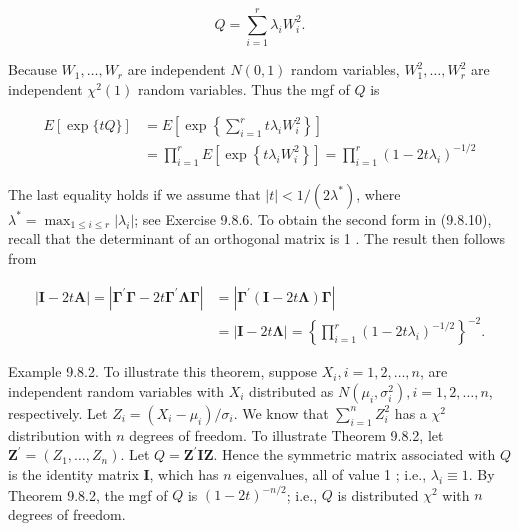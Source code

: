 \begin{equation*}
Q=\sum_{i=1}^{r} \lambda_{i} W_{i}^{2} . \tag{9.8.12}
\end{equation*}


Because $W_{1}, \ldots, W_{r}$ are independent $N(0,1)$ random variables, $W_{1}^{2}, \ldots, W_{r}^{2}$ are independent $\chi^{2}(1)$ random variables. Thus the mgf of $Q$ is


\begin{align*}
E[\exp \{t Q\}] & =E\left[\exp \left\{\sum_{i=1}^{r} t \lambda_{i} W_{i}^{2}\right\}\right] \\
& =\prod_{i=1}^{r} E\left[\exp \left\{t \lambda_{i} W_{i}^{2}\right\}\right]=\prod_{i=1}^{r}\left(1-2 t \lambda_{i}\right)^{-1 / 2} \tag{9.8.13}
\end{align*}


The last equality holds if we assume that $|t|<1 /\left(2 \lambda^{*}\right)$, where $\lambda^{*}=\max _{1 \leq i \leq r}\left|\lambda_{i}\right|$; see Exercise 9.8.6. To obtain the second form in (9.8.10), recall that the determinant of an orthogonal matrix is 1 . The result then follows from

$$
\begin{aligned}
|\mathbf{I}-2 t \mathbf{A}|=\left|\boldsymbol{\Gamma}^{\prime} \boldsymbol{\Gamma}-2 t \boldsymbol{\Gamma}^{\prime} \boldsymbol{\Lambda} \boldsymbol{\Gamma}\right| & =\left|\boldsymbol{\Gamma}^{\prime}(\mathbf{I}-2 t \boldsymbol{\Lambda}) \boldsymbol{\Gamma}\right| \\
& =|\mathbf{I}-2 t \boldsymbol{\Lambda}|=\left\{\prod_{i=1}^{r}\left(1-2 t \lambda_{i}\right)^{-1 / 2}\right\}^{-2} .
\end{aligned}
$$

Example 9.8.2. To illustrate this theorem, suppose $X_{i}, i=1,2, \ldots, n$, are independent random variables with $X_{i}$ distributed as $N\left(\mu_{i}, \sigma_{i}^{2}\right), i=1,2, \ldots, n$, respectively. Let $Z_{i}=\left(X_{i}-\mu_{i}\right) / \sigma_{i}$. We know that $\sum_{i=1}^{n} Z_{i}^{2}$ has a $\chi^{2}$ distribution with $n$ degrees of freedom. To illustrate Theorem 9.8.2, let $\mathbf{Z}^{\prime}=\left(Z_{1}, \ldots, Z_{n}\right)$. Let $Q=\mathbf{Z}^{\prime} \mathbf{I Z}$. Hence the symmetric matrix associated with $Q$ is the identity matrix $\mathbf{I}$, which has $n$ eigenvalues, all of value 1 ; i.e., $\lambda_{i} \equiv 1$. By Theorem 9.8.2, the mgf of $Q$ is $(1-2 t)^{-n / 2}$; i.e., $Q$ is distributed $\chi^{2}$ with $n$ degrees of freedom.

